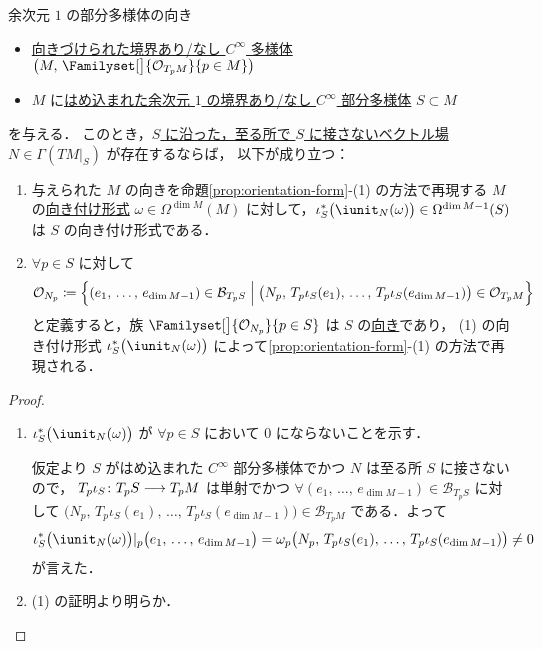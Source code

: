 \documentclass[geometry_main]{subfiles}
\begin{document}
\begin{myprop}[label=prop:submanifold-orientation]{余次元 $1$ の部分多様体の向き}
	\begin{itemize}
		\item \hyperref[def:smooth-orientation]{向きづけられた境界あり/なし $C^\infty$ 多様体} $\bigl(M,\, \Familyset[\big]{\mathcal{O}_{T_p M}}{p \in M}\bigr)$
		\item $M$ に\hyperref[def:submersion-smooth]{はめ込まれた\underline{余次元 $1$ の}境界あり/なし $C^\infty$ 部分多様体} $S \subset M$
	\end{itemize}
	を与える．
	このとき，\hyperref[def:vecf-along]{$S$ に沿った，至る所で $S$ に接さないベクトル場} $N \in \Gamma(TM|_S)$ が存在するならば，
	以下が成り立つ：
	\begin{enumerate}
		\item 与えられた $M$ の向きを命題\ref{prop:orientation-form}-(1) の方法で再現する $M$ の\hyperref[def:orientation-form]{向き付け形式} $\omega \in \Omega^{\dim M}(M)$ に対して，$\iota_S^* \bigl( \iunit_N (\omega) \bigr) \in \Omega^{\dim M - 1}(S)$ は $S$ の向き付け形式である．
		\item 
		$\forall p \in S$ に対して
		\begin{align}
			\mathcal{O}_{N_p} \coloneqq \Bigl\{(e_1,\, \dots,\, e_{\dim M - 1}) \in \mathcal{B}_{T_p S} \Bigm| \bigl(N_p,\, T_p \iota_S (e_1),\, \dots,\, T_p \iota_S(e_{\dim M - 1})\bigr) \in \mathcal{O}_{T_p M}\Bigr\}
		\end{align}
		と定義すると，族 $\Familyset[\big]{\mathcal{O}_{N_p}}{p \in S}$ は $S$ の\hyperref[def:smooth-orientation]{向き}であり，
		(1) の向き付け形式 $\iota_S^* \bigl( \iunit_N (\omega) \bigr)$ によって\ref{prop:orientation-form}-(1) の方法で再現される．
	\end{enumerate}
\end{myprop}

\begin{proof}
	\begin{enumerate}
		\item $\iota_S^* \bigl( \iunit_N (\omega) \bigr)$ が $\forall p \in S$ において $0$ にならないことを示す．
		
		仮定より $S$ がはめ込まれた $C^\infty$ 部分多様体でかつ $N$ は至る所 $S$ に接さないので，
		$T_p \iota_S \colon T_p S \longrightarrow T_p M$ は単射でかつ $\forall (e_1,\, \dots,\, e_{\dim M - 1}) \in \mathcal{B}_{T_p S}$ に対して $\bigl(N_p,\, T_p \iota_S(e_1),\, \dots,\, T_p \iota_S(e_{\dim M - 1})\bigr) \in \mathcal{B}_{T_p M}$ である．よって
		\begin{align}
			\iota_S^* \bigl( \iunit_N (\omega) \bigr)|_p \bigl( e_1,\, \dots,\, e_{\dim M - 1} \bigr) = \omega_p \bigl( N_p,\, T_p \iota_S(e_1),\, \dots,\, T_p \iota_S (e_{\dim M - 1}) \bigr) \neq 0
		\end{align}
		が言えた．
		\item (1) の証明より明らか．
	\end{enumerate}
\end{proof}
\end{document}

